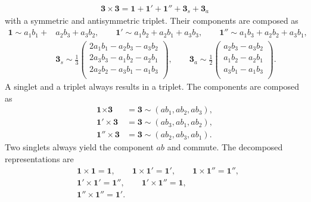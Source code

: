 \begin{appendix}
\begin{align}
 \textbf{3}\times\textbf{3} = \textbf{1} +\textbf{1}' +\textbf{1}'' +\textbf{3}_s +\textbf{3}_a
\end{align}
with a symmetric and antisymmetric triplet. Their components are composed as
\begin{align}
 \textbf{1} \sim a_1b_1 +& a_2b_3 + a_3b_2,\qquad  \textbf{1}' \sim a_1b_2 + a_2b_1 + a_3b_3,\qquad  \textbf{1}'' \sim a_1b_3 + a_2b_2 + a_3b_1,\\
  &\textbf{3}_s \sim \frac13\begin{pmatrix}
            2a_1b_1-a_2b_3-a_3b_2\\
            2a_3b_3-a_1b_2-a_2b_1\\
            2a_2b_2-a_3b_1-a_1b_3\\
           \end{pmatrix}, \qquad  \textbf{3}_a\sim\frac12\begin{pmatrix}
				a_2b_3-a_3b_2\\
				a_1b_2-a_2b_1\\
				a_3b_1-a_1b_3\\
				\end{pmatrix}.
\end{align}
A singlet and a triplet always results in a triplet. The components are composed as
\begin{align}
  \textbf{1}\times \textbf{3} &=  \textbf{3} \sim (ab_1,ab_2,ab_3),\\
  \textbf{1}'\times \textbf{3} &=  \textbf{3} \sim (ab_3,ab_1,ab_2),\\
  \textbf{1}''\times \textbf{3} &=  \textbf{3} \sim (ab_2,ab_3,ab_1).
\end{align}
Two singlets always yield the component $ab$ and commute. The decomposed representations are
\begin{align}
 &\textbf{1}\times\textbf{1}=\textbf{1},\qquad \textbf{1}\times\textbf{1}'=\textbf{1}',\qquad \textbf{1}\times\textbf{1}''=\textbf{1}'',\\
 &\textbf{1}'\times\textbf{1}' = \textbf{1}'', \qquad \textbf{1}'\times\textbf{1}'' = \textbf{1},\\
 &\textbf{1}'' \times \textbf{1}'' = \textbf{1}'.
\end{align}





 
\end{appendix}